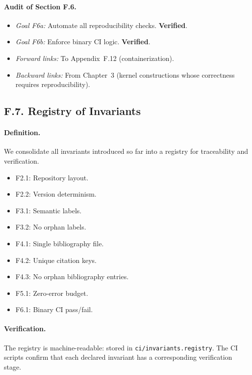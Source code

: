 \paragraph{Audit of Section F.6.}
\begin{itemize}
  \item \emph{Goal F6a:} Automate all reproducibility checks.
        \textbf{Verified}.
  \item \emph{Goal F6b:} Enforce binary CI logic.
        \textbf{Verified}.
  \item \emph{Forward links:} To Appendix~F.12 (containerization).
  \item \emph{Backward links:} From Chapter~3 (kernel constructions
        whose correctness requires reproducibility).
\end{itemize}

\subsection*{F.7. Registry of Invariants}

\paragraph{Definition.}
We consolidate all invariants introduced so far into a registry
for traceability and verification.

\begin{itemize}
  \item F2.1: Repository layout.
  \item F2.2: Version determinism.
  \item F3.1: Semantic labels.
  \item F3.2: No orphan labels.
  \item F4.1: Single bibliography file.
  \item F4.2: Unique citation keys.
  \item F4.3: No orphan bibliography entries.
  \item F5.1: Zero-error budget.
  \item F6.1: Binary CI pass/fail.
\end{itemize}

\paragraph{Verification.}
The registry is machine-readable: stored in
\texttt{ci/invariants.registry}. The CI scripts confirm that each
declared invariant has a corresponding verification stage.

